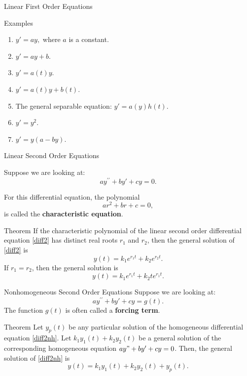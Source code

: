 \documentclass{beamer}
\begin{document}
\begin{frame}{Linear First Order Equations}
    \begin{block}
    {Examples}
    \begin{enumerate}
        \item $y'=ay,$ where $a$ is a constant.
        \item $y'=ay+b$.
        \item $y'=a(t)y$. 
        \item $y'=a(t)y+b(t)$.
        \item The general separable equation: $y'=a(y)h(t)$.
        \item $y'=y^2$. 
        \item $y'=y(a-by)$.
    \end{enumerate}
    \end{block}
\end{frame}


\begin{frame}{Linear Second Order Equations}

Suppose we are looking at:
\begin{equation}
    ay^{\prime \prime}+by'+cy=0.
    \label{diff2}
\end{equation}

For this differential equation, the polynomial 
\[ar^2+br+c=0,
\] is called the \textbf{characteristic equation}. 
\begin{block}{Theorem}
    If the characteristic polynomial of the linear second order differential equation \eqref{diff2} has distinct real roots $r_1$ and $r_2$, then the general solution of \eqref{diff2} is 
    \[y(t)=k_1e^{r_1t}+k_2e^{r_2t}.
    \]
    If $r_1=r_2$, then the general solution is 
    \[y(t)=k_1e^{r_1t}+k_2te^{r_1t}.
    \]
    \end{block}
\end{frame}


\begin{frame}{Nonhomogeneous Second Order Equations}  
Suppose we are looking at:
\begin{equation}
    ay^{\prime \prime}+by'+cy=g(t).
    \label{diff2nh}
\end{equation}
The function $g(t)$ is often called a \textbf{forcing term}.
    \begin{block}{Theorem}
    Let $y_p(t)$ be any particular solution of the homogeneous differential equation \eqref{diff2nh}. Let $k_1y_1(t)+k_2y_2(t)$ be a general solution of the corresponding homogeneous equation $ay"+by'+cy=0$. Then, the general solution of \eqref{diff2nh} is 
    \[y(t)=k_1y_1(t)+k_2y_2(t)+y_p(t).
    \]
    \end{block}
\end{frame}
\end{document}
